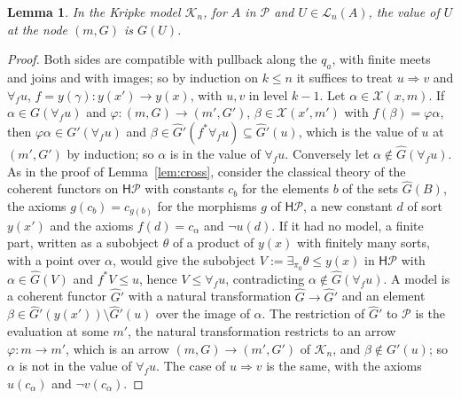 \documentclass[11pt]{amsart}
\newtheorem{lem}[thm]{Lemma}
\theoremstyle{definition}
\newcommand{\HH}{\mathsf H}
\newcommand{\cK}{\mathcal K}
\begin{document}
\begin{lem}\label{lem:truthP}
In the Kripke model $\cK_n$, for $A$ in $\mathcal P$ and $U\in
\mathcal L_n(A)$, the value of $U$ at the node $(m,G)$ is $G(U)$.
\end{lem}
\begin{proof}
Both sides are compatible with pullback along the $q_a$, with finite
meets and joins and with images; so by induction on $k\le n$ it
suffices to treat $u\Rightarrow v$ and $\forall_fu$, $f=y(\gamma)
\colon y(x')\to y(x)$, with $u,v$ in level $k-1$. Let $\alpha\in
\mathcal X(x,m)$. If $\alpha\in G(\forall_fu)$ and $\varphi\colon(m,G)
\to(m',G')$, $\beta\in\mathcal X(x',m')$ with $f(\beta)=\varphi\alpha$,
then $\varphi\alpha\in G'(\forall_fu)$ and $\beta\in\hat G'(f^*\forall_f
u)\subseteq\hat G'(u)$, which is the value of $u$ at $(m',G')$ by
induction; so $\alpha$ is in the value of $\forall_fu$. Conversely let
$\alpha\notin\hat G(\forall_fu)$. As in the proof of
Lemma~\ref{lem:cross}, consider the classical theory of the coherent
functors on $\HH\mathcal P$ with constants $c_b$ for the elements $b$
of the sets $\hat G(B)$, the axioms $g(c_b)=c_{g(b)}$ for the morphisms
$g$ of $\HH\mathcal P$, a new constant $d$ of sort $y(x')$ and the
axioms $f(d)=c_\alpha$ and $\neg u(d)$. If it had no model, a finite
part, written as a subobject $\theta$ of a product of $y(x)$ with
finitely many sorts, with a point over $\alpha$, would give the
subobject $V:=\exists_{\pi_0}\theta\le y(x)$ in $\HH\mathcal P$ with
$\alpha\in\hat G(V)$ and $f^*V\le u$, hence $V\le\forall_fu$,
contradicting $\alpha\notin\hat G(\forall_fu)$. A model is a coherent
functor $\hat G'$ with a natural transformation $\hat G\to\hat G'$ and
an element $\beta\in\hat G'(y(x'))\setminus\hat G'(u)$ over the image
of $\alpha$. The restriction of $\hat G'$ to $\mathcal P$ is the
evaluation at some $m'$, the natural transformation restricts to an
arrow $\varphi\colon m\to m'$, which is an arrow $(m,G)\to(m',G')$ of
$\cK_n$, and $\beta\notin G'(u)$; so $\alpha$ is not in the value of
$\forall_fu$. The case of $u\Rightarrow v$ is the same, with the
axioms $u(c_\alpha)$ and $\neg v(c_\alpha)$.
\end{proof}
\end{document}
